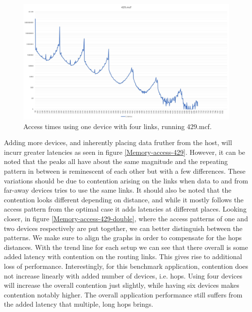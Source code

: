 \begin{figure}[!h]
    \centering
    \includegraphics[width=1.0\linewidth]{figure/429-x.4-1.jpg}
    \caption{Access times using one device with four links, running 429.mcf.}
    \label{Memory-access-429-single}
\end{figure}

Adding more devices, and inherently placing data fruther from the host, will incurr greater latencies as seen in figure \ref{Memory-access-429}. However, it can be noted that the peaks all have about the same magnitude and the repeating pattern in between is reminescent of each other but with a few differences. These variations should be due to contention arising on the links when data to and from far-away devices tries to use the same links. It should also be noted that the contention looks different depending on distance, and while it mostly follows the access pattern from the optimal case it adds latencies at different places. Looking closer, in figure \ref{Memory-access-429-double}, where the access patterns of one and two devices respectively are put together, we can better distinguish between the patterns. We make sure to align the graphs in order to compensate for the hops distances. With the trend line for each setup we can see that there overall is some added latency with contention on the routing links. This gives rise to additional loss of performance. Interestingly, for this benchmark application, contention does not increase linearly with added number of devices, i.e. hops. Using four devices will increase the overall contention just slightly, while having six devices makes contention notably higher. The overall application performance still suffers from the added latency that multiple, long hops brings.


